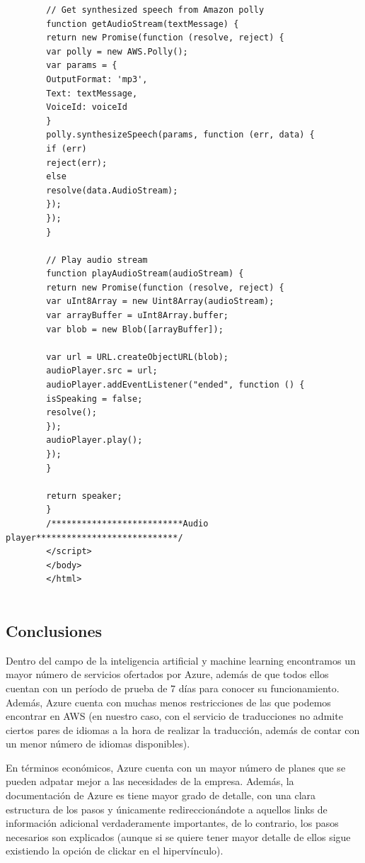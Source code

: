\documentclass[english,runningheads,a4paper]{llncs}[2018/03/10]
\begin{document}
{\begin{verbatim}
        // Get synthesized speech from Amazon polly
        function getAudioStream(textMessage) {
        return new Promise(function (resolve, reject) {
        var polly = new AWS.Polly();
        var params = {
        OutputFormat: 'mp3',
        Text: textMessage,
        VoiceId: voiceId
        }
        polly.synthesizeSpeech(params, function (err, data) {
        if (err)
        reject(err);
        else
        resolve(data.AudioStream);
        });
        });
        }
        
        // Play audio stream
        function playAudioStream(audioStream) {
        return new Promise(function (resolve, reject) {
        var uInt8Array = new Uint8Array(audioStream);
        var arrayBuffer = uInt8Array.buffer;
        var blob = new Blob([arrayBuffer]);
        
        var url = URL.createObjectURL(blob);
        audioPlayer.src = url;
        audioPlayer.addEventListener("ended", function () {
        isSpeaking = false;
        resolve();
        });
        audioPlayer.play();
        });
        }
        
        return speaker;
        }
        /**************************Audio player****************************/
        </script>
        </body>
        </html>
        
        \end{verbatim}
    }
    
    \subsection{Conclusiones}
    Dentro del campo de la inteligencia artificial y machine learning 
    encontramos un mayor número de servicios ofertados por Azure, además de que 
    todos ellos cuentan con un período de prueba de 7 días para conocer su 
    funcionamiento. Además, Azure cuenta con muchas menos restricciones de las 
    que podemos encontrar en AWS (en nuestro caso, con el servicio de 
    traducciones no admite ciertos pares de idiomas a la hora de realizar la 
    traducción, además de contar con un menor número de idiomas disponibles).
    
    En términos económicos, Azure cuenta con un mayor número de planes que se 
    pueden adpatar mejor a las necesidades de la empresa. Además, la 
    documentación de Azure es tiene mayor grado de detalle, con una clara 
    estructura de los pasos y únicamente redireccionándote a aquellos links de 
    información adicional verdaderamente importantes, de lo contrario, los 
    pasos necesarios son explicados (aunque si se quiere tener mayor detalle de 
    ellos sigue existiendo la opción de clickar en el hipervínculo).
    
\end{document}
